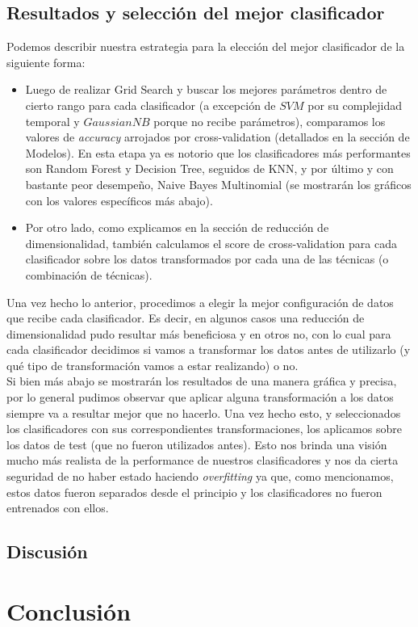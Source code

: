 \documentclass[a4paper]{article}
\begin{document}
\subsection{Resultados y selección del mejor clasificador}
Podemos describir nuestra estrategia para la elección del mejor clasificador de la siguiente forma:
\begin{itemize}
	\item  Luego de realizar Grid Search y buscar los mejores parámetros dentro de cierto rango para cada clasificador (a excepción de $SVM$ por su complejidad temporal y $GaussianNB$ porque no recibe parámetros), comparamos los valores de \textit{accuracy} arrojados por cross-validation (detallados en la sección de Modelos). En esta etapa ya es notorio que los clasificadores más performantes son Random Forest y Decision Tree, seguidos de KNN, y por último y con bastante peor desempeño, Naive Bayes Multinomial (se mostrarán los gráficos con los valores específicos más abajo).
	\item Por otro lado, como explicamos en la sección de reducción de dimensionalidad, también calculamos el score de cross-validation para cada clasificador sobre los datos transformados por cada una de las técnicas (o combinación de técnicas).
\end{itemize}

Una vez hecho lo anterior, procedimos a elegir la mejor configuración de datos que recibe cada clasificador. Es decir, en algunos casos una reducción de dimensionalidad pudo resultar más beneficiosa y en otros no, con lo cual para cada clasificador decidimos si vamos a transformar los datos antes de utilizarlo (y qué tipo de transformación vamos a estar realizando) o no. \\

Si bien más abajo se mostrarán los resultados de una manera gráfica y precisa, por lo general pudimos observar que aplicar alguna transformación a los datos siempre va a resultar mejor que no hacerlo. Una vez hecho esto, y seleccionados los clasificadores con sus correspondientes transformaciones, los aplicamos sobre los datos de test (que no fueron utilizados antes). Esto nos brinda una visión mucho más realista de la performance de nuestros clasificadores y nos da cierta seguridad de no haber estado haciendo \textit{overfitting} ya que, como mencionamos, estos datos fueron separados desde el principio y los clasificadores no fueron entrenados con ellos.

\subsection{Discusión}

\section{Conclusión}
\end{document}
